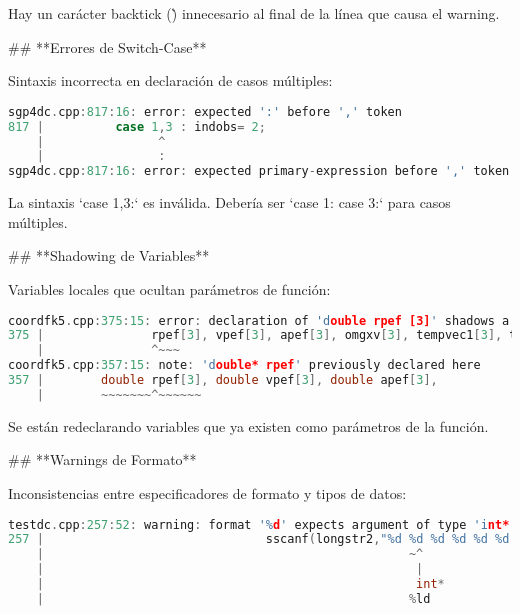 \documentclass[12pt,a4paper]{article}
\begin{document}
Hay un carácter backtick (\`) innecesario al final de la línea que causa el warning.


\begin{markdown}
## **Errores de Switch-Case**

Sintaxis incorrecta en declaración de casos múltiples:
\end{markdown}

\begin{lstlisting}[language=C++]
sgp4dc.cpp:817:16: error: expected ':' before ',' token
817 |          case 1,3 : indobs= 2;
    |                ^
    |                :
sgp4dc.cpp:817:16: error: expected primary-expression before ',' token
\end{lstlisting}

La sintaxis `case 1,3:` es inválida. Debería ser `case 1: case 3:` para casos múltiples.


\begin{markdown}
## **Shadowing de Variables**

Variables locales que ocultan parámetros de función:
\end{markdown}

\begin{lstlisting}[language=C++]
coordfk5.cpp:375:15: error: declaration of 'double rpef [3]' shadows a parameter
375 |               rpef[3], vpef[3], apef[3], omgxv[3], tempvec1[3], tempvec[3];
    |               ^~~~
coordfk5.cpp:357:15: note: 'double* rpef' previously declared here
357 |        double rpef[3], double vpef[3], double apef[3],
    |        ~~~~~~~^~~~~~~
\end{lstlisting}

Se están redeclarando variables que ya existen como parámetros de la función.


\begin{markdown}
## **Warnings de Formato**

Inconsistencias entre especificadores de formato y tipos de datos:
\end{markdown}

\begin{lstlisting}[language=C++]
testdc.cpp:257:52: warning: format '%d' expects argument of type 'int*', but argument 4 has type 'long int*' [-Wformat=]
257 |                               sscanf(longstr2,"%d %d %d %d %d %d %d %d %lf ",
    |                                                   ~^
    |                                                    |
    |                                                    int*
    |                                                   %ld
\end{lstlisting}
\end{document}
